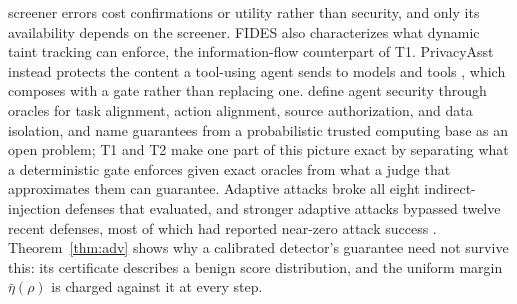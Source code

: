 screener errors cost confirmations or utility rather than security, and only its availability
depends on the screener. FIDES also characterizes what dynamic taint tracking
can enforce, the information-flow counterpart of T1. PrivacyAsst instead protects the content a
tool-using agent sends to models and tools \citep{zhang2024privacyasst}, which composes with a
gate rather than replacing one. \citet{siu2026framework} define agent security through oracles
for task alignment, action alignment, source authorization, and data isolation, and
\citet{christodorescu2025systems} name guarantees from a probabilistic trusted computing base as
an open problem; T1 and T2 make one part of this picture exact by separating what a
deterministic gate enforces given exact oracles from what a judge that approximates them can
guarantee. Adaptive attacks broke all eight indirect-injection defenses that
\citet{zhan2025adaptive} evaluated, and stronger adaptive attacks bypassed twelve recent
defenses, most of which had reported near-zero attack success \citep{nasr2025attacker}.
Theorem~\ref{thm:adv} shows why a calibrated
detector's guarantee need not survive this: its certificate describes a benign
score distribution, and the uniform margin $\bar\eta(\rho)$ is charged against it
at every step.

